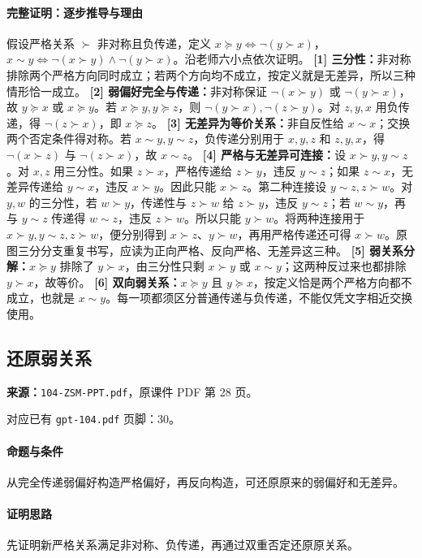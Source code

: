 \paragraph{完整证明：逐步推导与理由}
假设严格关系 $\succ$ 非对称且负传递，定义 $x\succeq y\iff\neg(y\succ x)$，$x\sim y\iff\neg(x\succ y)\land\neg(y\succ x)$。沿老师六小点依次证明。
\textbf{[1] 三分性：}非对称排除两个严格方向同时成立；若两个方向均不成立，按定义就是无差异，所以三种情形恰一成立。
\textbf{[2] 弱偏好完全与传递：}非对称保证 $\neg(x\succ y)$ 或 $\neg(y\succ x)$，故 $y\succeq x$ 或 $x\succeq y$。若 $x\succeq y,y\succeq z$，则 $\neg(y\succ x),\neg(z\succ y)$。对 $z,y,x$ 用负传递，得 $\neg(z\succ x)$，即 $x\succeq z$。
\textbf{[3] 无差异为等价关系：}非自反性给 $x\sim x$；交换两个否定条件得对称。若 $x\sim y,y\sim z$，负传递分别用于 $x,y,z$ 和 $z,y,x$，得 $\neg(x\succ z)$ 与 $\neg(z\succ x)$，故 $x\sim z$。
\textbf{[4] 严格与无差异可连接：}设 $x\succ y,y\sim z$。对 $x,z$ 用三分性。如果 $z\succ x$，严格传递给 $z\succ y$，违反 $y\sim z$；如果 $z\sim x$，无差异传递给 $y\sim x$，违反 $x\succ y$。因此只能 $x\succ z$。第二种连接设 $y\sim z,z\succ w$。对 $y,w$ 的三分性，若 $w\succ y$，传递性与 $z\succ w$ 给 $z\succ y$，违反 $y\sim z$；若 $w\sim y$，再与 $y\sim z$ 传递得 $w\sim z$，违反 $z\succ w$。所以只能 $y\succ w$。将两种连接用于 $x\succ y,y\sim z,z\succ w$，便分别得到 $x\succ z$、$y\succ w$，再用严格传递还可得 $x\succ w$。原图三分分支重复书写，应读为正向严格、反向严格、无差异这三种。
\textbf{[5] 弱关系分解：}$x\succeq y$ 排除了 $y\succ x$，由三分性只剩 $x\succ y$ 或 $x\sim y$；这两种反过来也都排除 $y\succ x$，故等价。
\textbf{[6] 双向弱关系：}$x\succeq y$ 且 $y\succeq x$，按定义恰是两个严格方向都不成立，也就是 $x\sim y$。每一项都须区分普通传递与负传递，不能仅凭文字相近交换使用。
\clearpage\subsection{还原弱关系}
\textbf{来源：}\texttt{104-ZSM-PPT.pdf}，原课件 PDF 第 28 页。\par
对应已有 \texttt{gpt-104.pdf} 页脚：30。\par
\paragraph{命题与条件}从完全传递弱偏好构造严格偏好，再反向构造，可还原原来的弱偏好和无差异。
\paragraph{证明思路}先证明新严格关系满足非对称、负传递，再通过双重否定还原原关系。
